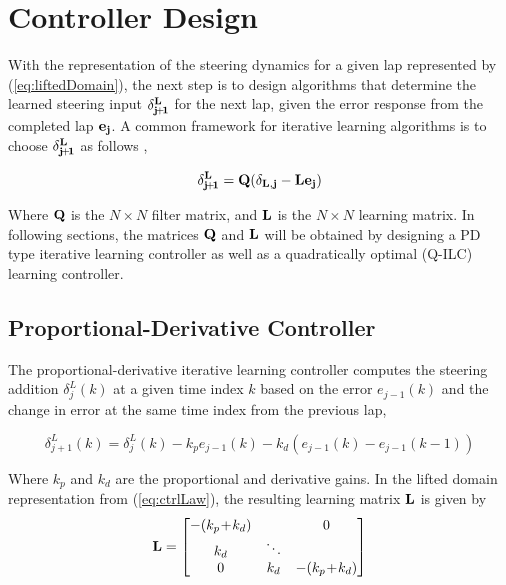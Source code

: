 \documentclass[letterpaper, 10 pt, conference]{ieeeconf}  %
\begin{document}
\section{Controller Design}

With the representation of the steering dynamics for a given lap represented by (\ref{eq:liftedDomain}), the next step is to
design algorithms that determine the learned steering input $\bf{\delta}^L_{j\!+\!1}$ for the next lap, given the error response
from the completed lap $\bf{e_{j}}$. A common framework for iterative learning algorithms is to choose $\bf{\delta}^L_{j\!+\!1}$ as follows \cite{bristow},

\begin{align}
\bf{\delta}^L_{j\!+\!1} = Q(\bf{\delta_{L,j}} - L\bf{e_{j}})
\label{eq:ctrlLaw}
\end{align}

Where $\bf{Q}$ is the $N \times N$ filter matrix, and $\bf{L}$ is the $N \times N$ learning matrix. In following sections, the
matrices $\bf{Q}$ and $\bf{L}$ will be obtained by designing a PD type iterative learning controller as well as a quadratically
optimal (Q-ILC) learning controller.

\subsection{Proportional-Derivative Controller}

The proportional-derivative iterative learning controller computes the steering addition $\delta^L_j(k)$ at a given time index $k$ based on the error $e_{j\!-\!1}(k)$ and the change in error
at the same time index from the previous lap,

\begin{equation}
	\delta^L_{{j\!+\!1}}(k) = \delta^L_j(k) - k_pe_{j\!-\!1}(k) - k_d(e_{j\!-\!1}(k) - e_{j\!-\!1}(k-1))
\end{equation}

Where $k_p$ and $k_d$ are the proportional and derivative gains. In the lifted domain representation from (\ref{eq:ctrlLaw}), the resulting learning matrix $\bf{L}$ is given by
\begin{equation}
	\bf{L} = \begin{bmatrix} -(k_p\!+\!k_d) &               &    0 \\ 
						 k_d           &  \ddots  &   \\ 
						 0             &   k_d            &    -(k_p\!+\!k_d)  \\ \end{bmatrix}
\end{equation}
 
\end{document}
